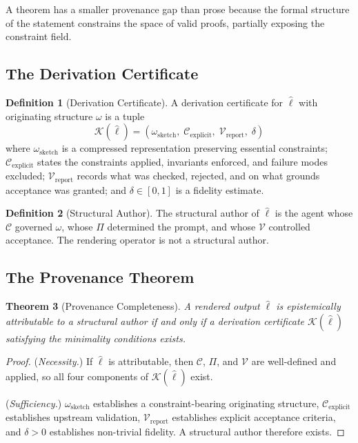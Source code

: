 \documentclass[12pt, a4paper]{article}
\theoremstyle{plain}
\newtheorem{theorem}{Theorem}[section]
\theoremstyle{definition}
\newtheorem{definition}[theorem]{Definition}
\theoremstyle{remark}
\begin{document}
A theorem has a smaller provenance gap than prose because the formal structure of the statement constrains the space of valid proofs, partially exposing the constraint field.

\subsection{The Derivation Certificate}

\begin{definition}[Derivation Certificate]
A derivation certificate for $\hat{\ell}$ with originating structure $\omega$ is a tuple
\[
\mathcal{K}(\hat{\ell}) = (\omega_{\mathrm{sketch}},\; \mathcal{C}_{\mathrm{explicit}},\; \mathcal{V}_{\mathrm{report}},\; \delta)
\]
where $\omega_{\mathrm{sketch}}$ is a compressed representation preserving essential constraints; $\mathcal{C}_{\mathrm{explicit}}$ states the constraints applied, invariants enforced, and failure modes excluded; $\mathcal{V}_{\mathrm{report}}$ records what was checked, rejected, and on what grounds acceptance was granted; and $\delta \in [0,1]$ is a fidelity estimate.
\end{definition}

\begin{definition}[Structural Author]
The structural author of $\hat{\ell}$ is the agent whose $\mathcal{C}$ governed $\omega$, whose $\Pi$ determined the prompt, and whose $\mathcal{V}$ controlled acceptance. The rendering operator is not a structural author.
\end{definition}

\subsection{The Provenance Theorem}

\begin{theorem}[Provenance Completeness]
A rendered output $\hat{\ell}$ is epistemically attributable to a structural author if and only if a derivation certificate $\mathcal{K}(\hat{\ell})$ satisfying the minimality conditions exists.
\end{theorem}

\begin{proof}
(\textit{Necessity.}) If $\hat{\ell}$ is attributable, then $\mathcal{C}$, $\Pi$, and $\mathcal{V}$ are well-defined and applied, so all four components of $\mathcal{K}(\hat{\ell})$ exist.

(\textit{Sufficiency.}) $\omega_{\mathrm{sketch}}$ establishes a constraint-bearing originating structure, $\mathcal{C}_{\mathrm{explicit}}$ establishes upstream validation, $\mathcal{V}_{\mathrm{report}}$ establishes explicit acceptance criteria, and $\delta > 0$ establishes non-trivial fidelity. A structural author therefore exists.
\end{proof}
\end{document}
